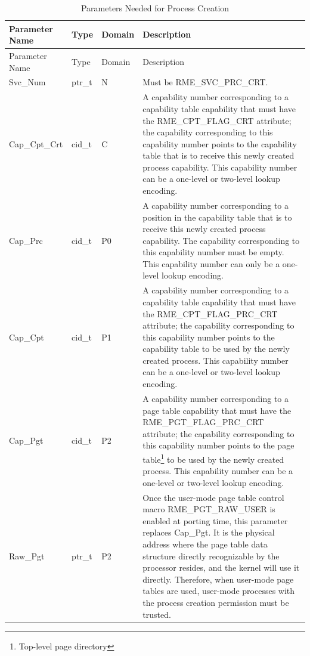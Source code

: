\begin{xltabular}{\textwidth}{@{}>{\hsize\raggedright\arraybackslash}X>{\hsize\raggedright\arraybackslash}X>{\hsize\raggedright\arraybackslash}X>{\hsize\raggedright\arraybackslash}X@{}}
\caption{Parameters Needed for Process Creation}\label{tab:4-10-create-process-parameters}\\
\toprule
Parameter Name & Type & Domain & Description\tabularnewline
\endfirsthead
\toprule
Parameter Name & Type & Domain & Description\tabularnewline
\midrule
\endhead
\bottomrule
\endlastfoot
Svc\_Num & ptr\_t & N & Must be RME\_SVC\_PRC\_CRT.\tabularnewline
Cap\_Cpt\_Crt & cid\_t & C &
A capability number corresponding to a capability table capability that must have the RME\_CPT\_FLAG\_CRT attribute; the capability corresponding to this capability number points to the capability table that is to receive this newly created process capability. This capability number can be a one-level or two-level lookup encoding.\tabularnewline
Cap\_Prc & cid\_t & P0 &
A capability number corresponding to a position in the capability table that is to receive this newly created process capability. The capability corresponding to this capability number must be empty. This capability number can only be a one-level lookup encoding.\tabularnewline
Cap\_Cpt & cid\_t & P1 &
A capability number corresponding to a capability table capability that must have the RME\_CPT\_FLAG\_PRC\_CRT attribute; the capability corresponding to this capability number points to the capability table to be used by the newly created process. This capability number can be a one-level or two-level lookup encoding.\tabularnewline
Cap\_Pgt & cid\_t & P2 &
A capability number corresponding to a page table capability that must have the RME\_PGT\_FLAG\_PRC\_CRT attribute; the capability corresponding to this capability number points to the page table\footnote{Top-level page directory} to be used by the newly created process. This capability number can be a one-level or two-level lookup encoding.\tabularnewline
Raw\_Pgt & ptr\_t & P2 &
Once the user-mode page table control macro RME\_PGT\_RAW\_USER is enabled at porting time, this parameter replaces Cap\_Pgt. It is the physical address where the page table data structure directly recognizable by the processor resides, and the kernel will use it directly. Therefore, when user-mode page tables are used, user-mode processes with the process creation permission must be trusted.\tabularnewline
\end{xltabular}
\nopagebreak[4]

